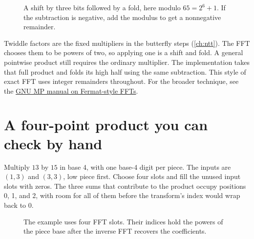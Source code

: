 \begin{figure}[H]
\centering
{}
\caption{A shift by three bits followed by a fold, here modulo $65=2^6+1$.
If the subtraction is negative, add the modulus to get a nonnegative remainder.}
\end{figure}

Twiddle factors are the fixed multipliers in the butterfly steps
(\cref{ch:ntt}). The FFT chooses them to be powers of two, so applying one
is a shift and fold. A general pointwise product still requires the
ordinary multiplier. The implementation takes that full product and
folds its high half using the same subtraction. This style of exact FFT
uses integer remainders throughout. For the broader technique, see the
\href{https://gmplib.org/manual/FFT-Multiplication}{GNU MP manual on Fermat-style FFTs}.

\newpage
\section{A four-point product you can check by hand}

Multiply $13$ by $15$ in base 4, with one base-4 digit per piece. The inputs
are $(1,3)$ and $(3,3)$, low piece first. Choose four slots and fill the
unused input slots with zeros. The three sums that contribute to the
product occupy positions 0, 1, and 2, with room for all of them before
the transform's index would wrap back to 0.

\begin{figure}[H]
\centering
{}
\caption{The example uses four FFT slots. Their indices hold the powers of the piece
base after the inverse FFT recovers the coefficients.}
\end{figure}

